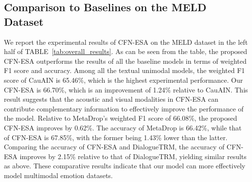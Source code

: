 \documentclass[journal]{IEEEtran}
\begin{document}
\subsection{Comparison to Baselines on the MELD Dataset}
We report the experimental results of CFN-ESA on the MELD dataset in the left half of TABLE~\ref{tab:overall_results}. As can be seen from the table, the proposed CFN-ESA outperforms the results of all the baseline models in terms of weighted F1 score and accuracy. Among all the textual unimodal models, the weighted F1 score of CauAIN is 65.46\%, which is the highest experimental performance. Our CFN-ESA is 66.70\%, which is an improvement of 1.24\% relative to CauAIN. This result suggests that the acoustic and visual modalities in CFN-ESA can contribute complementary information to effectively improve the performance of the model. Relative to MetaDrop's weighted F1 score of 66.08\%, the proposed CFN-ESA improves by 0.62\%. The accuracy of MetaDrop is 66.42\%, while that of CFN-ESA is 67.85\%, with the former being 1.43\% lower than the latter. Comparing the accuracy of CFN-ESA and DialogueTRM, the accuracy of CFN-ESA improves by 2.15\% relative to that of DialogueTRM, yielding similar results as above. These comparative results indicate that our model can more effectively model multimodal emotion datasets.
\end{document}
